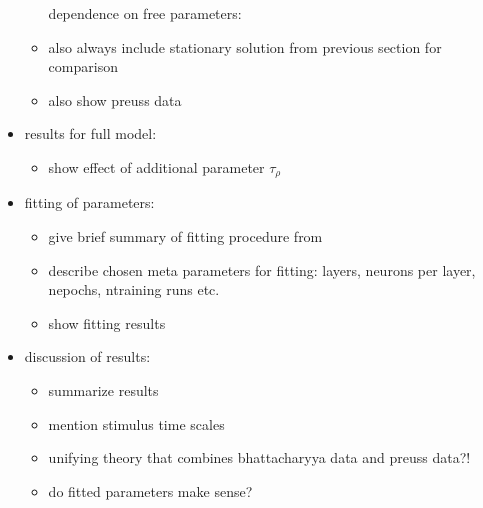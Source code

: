 \documentclass[a4paper,10pt,hidelinks]{scrreprt}
\begin{document}
\begin{itemize}
\begin{itemize}
			dependence on free parameters: 
			\item also always include stationary solution from previous section for comparison
			\item also show preuss data
		\end{itemize}
		\item results for full model:
		\begin{itemize}
			\item show effect of additional parameter $\tau_{\rho}$
		\end{itemize}
		\item fitting of parameters:
		\begin{itemize}
			\item give brief summary of fitting procedure from \cite{Lueckmann2018}
			\item describe chosen meta parameters for fitting: layers, neurons per layer, nepochs, 
			ntraining runs etc.
			\item show fitting results
		\end{itemize}
		\item discussion of results:
		\begin{itemize}
			\item summarize results
			\item mention stimulus time scales
			\item unifying theory that combines bhattacharyya data and preuss data?!
			\item do fitted parameters make sense?
		\end{itemize}
	\end{itemize}
\end{document}
